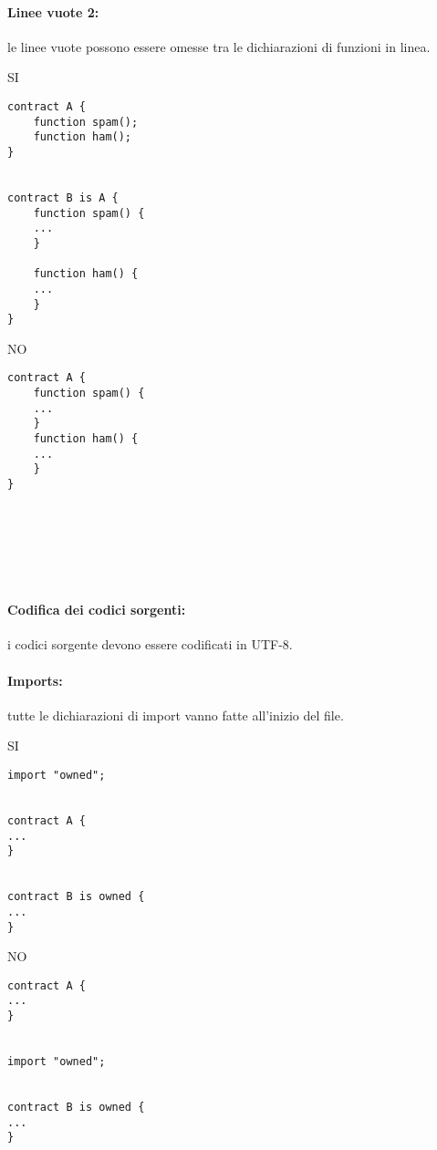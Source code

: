 \documentclass[../processi_primari.tex]{subfiles}
\begin{document}
\paragraph{Linee vuote 2: }
le linee vuote possono essere omesse tra le dichiarazioni di funzioni in linea.\\

\begin{minipage}{6cm}
{\begin{center}SI\end{center}}
\begin{Verbatim}[frame=single]
contract A {
	function spam();
	function ham();
}


contract B is A {
	function spam() {
	...
	}
	
	function ham() {
	...
	}
}
\end{Verbatim}
\end{minipage}
\hfill
\begin{minipage}{6cm}
{\begin{center}NO\end{center}}
\begin{Verbatim}[frame=single]
contract A {
	function spam() {
	...
	}
	function ham() {
	...
	}
}







\end{Verbatim}
\end{minipage}

\paragraph*{Codifica dei codici sorgenti: }
i codici sorgente devono essere codificati in UTF-8.

\paragraph*{Imports: }
tutte le dichiarazioni di import vanno fatte all'inizio del file.\\

\begin{minipage}{6cm}
{\begin{center}SI\end{center}}
\begin{Verbatim}[frame=single]
import "owned";


contract A {
...
}


contract B is owned {
...
}
\end{Verbatim}
\end{minipage}
\hfill
\begin{minipage}{6cm}
{\begin{center}NO\end{center}}
\begin{Verbatim}[frame=single]
contract A {
...
}


import "owned";


contract B is owned {
...
}
\end{Verbatim}
\end{minipage}
\end{document}
